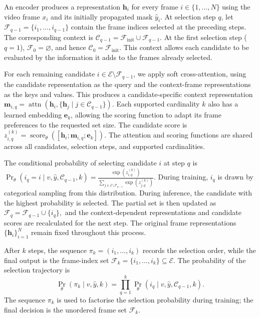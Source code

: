 An encoder produces a representation \(\mathbf{h}_i\) for every frame
\(i\in\{1,\ldots,N\}\) using the video frame \(x_i\) and its initially
propagated mask \(\widehat{y}_i\). At selection step \(q\), let
\(
\mathcal{F}_{q-1}
=
\{i_1,\ldots,i_{q-1}\}
\)
contain the frame indices selected at the preceding steps. The corresponding
context is
\(
\mathcal{C}_{q-1}
=
\mathcal{F}_{\mathrm{init}}\cup\mathcal{F}_{q-1}.
\)
At the first selection step (\(q=1\)),
\(\mathcal{F}_0=\varnothing\), and hence
\(\mathcal{C}_0=\mathcal{F}_{\mathrm{init}}\).
This context allows each candidate to be evaluated by the information it adds
to the frames already selected.

For each remaining candidate
\(i\in\mathcal{E}\setminus\mathcal{F}_{q-1}\), we apply soft cross-attention,
using the candidate representation as the query and the context-frame
representations as the keys and values. This produces a candidate-specific
context representation
\(
\mathbf{m}_{i,q}
=
\operatorname{attn}
\left(
\mathbf{h}_i,
\{\mathbf{h}_j\mid j\in\mathcal{C}_{q-1}\}
\right).
\)
Each supported cardinality \(k\) also has a learned embedding
\(\mathbf{e}_k\), allowing the scoring function to adapt its frame preferences
to the requested set size. The candidate score is
\(
z^{(k)}_{i,q}
=
\operatorname{score}_{\theta}
\left(
[\mathbf{h}_i;\mathbf{m}_{i,q};\mathbf{e}_k]
\right).
\)
The attention and scoring functions are shared across all candidates,
selection steps, and supported cardinalities.

The conditional probability of selecting candidate \(i\) at step \(q\) is
\(
\Pr_{\theta}
\left(
i_q=i
\mid
v,\widehat{y},\mathcal{C}_{q-1},k
\right)
=
\frac{
\exp\left(z^{(k)}_{i,q}\right)
}{
\displaystyle
\sum_{j\in\mathcal{E}\setminus\mathcal{F}_{q-1}}
\exp\left(z^{(k)}_{j,q}\right)
}.
\)
During training, \(i_q\) is drawn by categorical sampling from this
distribution. During inference, the candidate with the highest probability
is selected. The partial set is then updated as
\(
\mathcal{F}_q
=
\mathcal{F}_{q-1}\cup\{i_q\},
\)
and the context-dependent representations and candidate scores are
recalculated for the next step. The original frame representations
\(\{\mathbf{h}_i\}_{i=1}^{N}\) remain fixed throughout this process.

After \(k\) steps, the sequence
\(
\pi_k=(i_1,\ldots,i_k)
\)
records the selection order, while the final output is the frame-index set
\(
\mathcal{F}_k=\{i_1,\ldots,i_k\}\subseteq\mathcal{E}.
\)
The probability of the selection trajectory is
\begin{equation}
\Pr_{\theta}
\left(
\pi_k\mid v,\widehat{y},k
\right)
=
\prod_{q=1}^{k}
\Pr_{\theta}
\left(
i_q
\mid
v,\widehat{y},\mathcal{C}_{q-1},k
\right).
\label{eq:trajectory_probability}
\end{equation}
The sequence \(\pi_k\) is used to factorise the selection probability
during training; the final decision is the unordered frame set
\(\mathcal{F}_k\).

